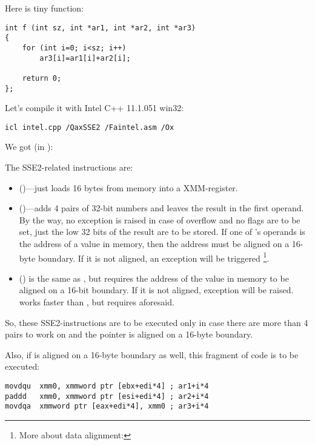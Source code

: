 Here is tiny function:

\begin{lstlisting}
int f (int sz, int *ar1, int *ar2, int *ar3)
{
	for (int i=0; i<sz; i++)
		ar3[i]=ar1[i]+ar2[i];

	return 0;
};
\end{lstlisting}


Let's compile it with Intel C++ 11.1.051 win32:

\begin{verbatim}
icl intel.cpp /QaxSSE2 /Faintel.asm /Ox
\end{verbatim}

We got (in \IDA):



The SSE2-related instructions are:
\begin{itemize}
\item
\MOVDQU ()---just loads 16 bytes from memory into a XMM-register.

\item
\PADDD ()---adds 4 pairs of 32-bit numbers and leaves the result in the first operand.
By the way, no exception is raised in case of overflow and no flags are to be set, 
just the low 32 bits of the result are to be stored.
If one of \PADDD's operands is the address of a value in memory,
then the address must be aligned on a 16-byte boundary. 
If it is not aligned, an exception will be triggered
\footnote{More about data alignment: \URLWPDA}.

\item
\MOVDQA ()
is the same as \MOVDQU, but requires the address of the value in memory to be aligned on a 16-bit boundary.
If it is not aligned, exception will be raised.
\MOVDQA works faster than \MOVDQU, but requires aforesaid.

\end{itemize}

So, these SSE2-instructions are to be executed only in case there are more than 4 pairs to work on
and the pointer  is aligned on a 16-byte boundary.

Also, if  is aligned on a 16-byte boundary as well, 
this fragment of code is to be executed:

\begin{lstlisting}
movdqu  xmm0, xmmword ptr [ebx+edi*4] ; ar1+i*4
paddd   xmm0, xmmword ptr [esi+edi*4] ; ar2+i*4
movdqa  xmmword ptr [eax+edi*4], xmm0 ; ar3+i*4
\end{lstlisting}

